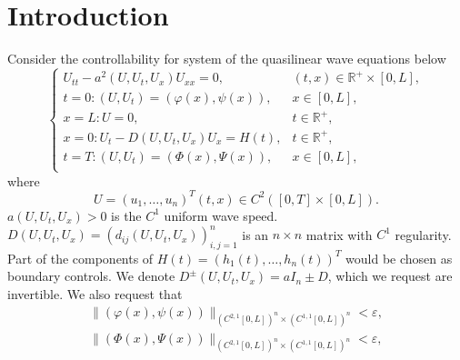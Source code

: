 \documentclass[a4paper,reqno,11pt]{amsart}
\numberwithin{equation}{section} %
\begin{document}
\maketitle



\section{Introduction}\label{intro sec}
Consider the controllability for system of the quasilinear wave equations below
\begin{equation}\label{42}
    \begin{cases}
	U_{tt}-a^2\left( U,U_t,U_x \right) U_{xx}=0,&		\left( t,x \right) \in \mathbb{R}^+\times \left[ 0,L \right] ,\\
	t=0:\left( U,U_t \right) =\left( \varphi  \left( x \right) ,\psi \left( x \right) \right) ,&		x\in \left[ 0,L \right] ,\\
	x=L:U=0,&		t\in \mathbb{R}^+,\\
	x=0:U_t-D\left( U,U_t,U_x \right) U_x=H\left( t \right) ,&		t\in \mathbb{R}^+,\\
	t=T:\left( U,U_t \right) =\left( \varPhi   \left( x \right) ,\varPsi  \left( x \right) \right) ,&		x\in \left[ 0,L \right] ,\\
\end{cases}
\end{equation}
where
$$
U=\left(u_1, \ldots, u_n\right)^T(t, x) \in C^2([0,T]\times [0,L]) .
$$
$a\left(U, U_t, U_x\right)>0$ is the $C^1$ uniform wave speed. $D\left(U, U_t, U_x\right)=\left(d_{i j}\left(U, U_t, U_x\right)\right)_{i, j=1}^n$ is an   $n \times n$ matrix with $C^1$ regularity. 
Part of the components of $H(t)=\left(h_1(t), \ldots, h_n(t)\right)^T$ would be chosen as boundary controls. 
We denote $D^{\pm}\left( U,U_t,U_x \right) =a I_n \pm D $, which we request are invertible. We also request that
$$
\begin{aligned}
	\lVert \left( \varphi  \left( x \right) ,\psi \left( x \right) \right) \rVert _{\left( C^{2,1}\left[ 0,L \right] \right) ^n\times \left( C^{1,1}\left[ 0,L \right] \right) ^n}  < \varepsilon ,\\
	\lVert \left( \varPhi   \left( x \right) ,\varPsi \left( x \right) \right) \rVert _{\left( C^{2,1}\left[ 0,L \right] \right) ^n\times \left( C^{1,1}\left[ 0,L \right] \right) ^n}  < \varepsilon ,\\
\end{aligned}
$$
\end{document}
